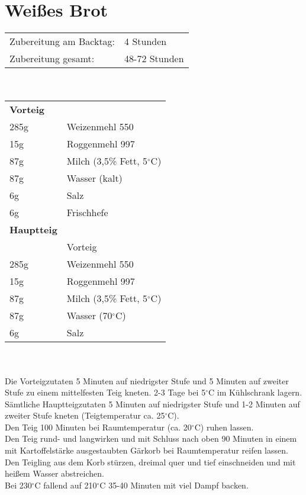 \section{Weißes Brot}
\begin{tabular}{ll}
    Zubereitung am Backtag: & 4 Stunden     \\
    Zubereitung gesamt:     & 48-72 Stunden
\end{tabular}\\\paragraph*{}
\begin{tabular}{ll}
    \textbf{Vorteig} \\
    285g & Weizenmehl 550                 \\
    15g  & Roggenmehl 997                 \\
    87g  & Milch (3,5\% Fett, 5$^\circ$C) \\
    87g  & Wasser (kalt)                  \\
    6g   & Salz                           \\
    6g   & Frischhefe                     \\
    \textbf{Hauptteig} \\
    & Vorteig                        \\
    285g & Weizenmehl 550                 \\
    15g  & Roggenmehl 997                 \\
    87g  & Milch (3,5\% Fett, 5$^\circ$C) \\
    87g  & Wasser (70$^\circ$C)           \\
    6g   & Salz                           \\
\end{tabular}\\\paragraph*{}
Die Vorteigzutaten 5 Minuten auf niedrigster Stufe und 5 Minuten auf zweiter Stufe zu einem mittelfesten Teig kneten. 2-3 Tage bei 5$^\circ$C im Kühlschrank lagern.\\
Sämtliche Hauptteigzutaten 5 Minuten auf niedrigster Stufe und 1-2 Minuten auf zweiter Stufe kneten (Teigtemperatur ca. 25$^\circ$C).\\
Den Teig 100 Minuten bei Raumtemperatur (ca. 20$^\circ$C) ruhen lassen.\\
Den Teig rund- und langwirken und mit Schluss nach oben 90 Minuten in einem mit Kartoffelstärke ausgestaubten Gärkorb bei Raumtemperatur reifen lassen.\\
Den Teigling aus dem Korb stürzen, dreimal quer und tief einschneiden und mit heißem Wasser abstreichen.\\
Bei 230$^\circ$C fallend auf 210$^\circ$C 35-40 Minuten mit viel Dampf backen.
\pagebreak


